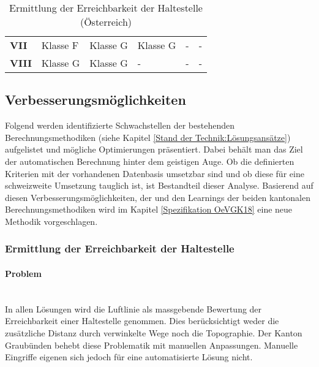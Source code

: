 \begin{table}[ht]
\begin{tabular}[c]{l p{2.0cm} p{2.0cm} p{2.0cm} p{2.0cm} p{2.0cm}}
        \cellcolor{red!25}\textbf{VII}
                                & \cellcolor{red!25}Klasse F
                                & \cellcolor{red!25}Klasse G
                                & \cellcolor{red!25}Klasse G
                                & -
                                & -\\
        \cellcolor{red!25}\textbf{VIII}
                                & \cellcolor{red!25}Klasse G
                                & \cellcolor{red!25}Klasse G
                                & -
                                & -
                                & -\\                          
        \bottomrule
    \end{tabular}
    \caption{Ermittlung der Erreichbarkeit der \gls{Haltestelle} (Österreich)}
    \label{table:Ermittlung Erreichbarkeit der Haltestelle (Österreich)}
\end{table}

\subsection{Verbesserungsmöglichkeiten}
\label{Stand der Technik:Verbesserungsmöglichkeiten und Zusammenhang zu bestehenden Lösungen}

Folgend werden identifizierte Schwachstellen der bestehenden Berechnungsmethodiken (siehe Kapitel \ref{Stand der Technik:Lösungsansätze}) aufgelistet und mögliche Optimierungen präsentiert.
Dabei behält man das Ziel der automatischen Berechnung hinter dem geistigen Auge.
Ob die definierten Kriterien mit der vorhandenen Datenbasis umsetzbar sind und ob diese für eine schweizweite Umsetzung tauglich ist, ist Bestandteil dieser Analyse.
Basierend auf diesen Verbesserungsmöglichkeiten, der  und den Learnings der beiden kantonalen Berechnungsmethodiken wird im Kapitel \ref{Spezifikation OeVGK18} eine neue Methodik vorgeschlagen.

\subsubsection{Ermittlung der Erreichbarkeit der Haltestelle}
\label{Verbesserungsmöglichkeiten:Ermittlung der Erreichbarkeit der Haltestelle}

\paragraph{Problem}~\\
In allen Lösungen wird die Luftlinie als massgebende Bewertung der Erreichbarkeit einer \gls{Haltestelle} genommen.
Dies berücksichtigt weder die zusätzliche Distanz durch verwinkelte Wege noch die Topographie.
Der Kanton Graubünden behebt diese Problematik mit manuellen Anpassungen.
Manuelle Eingriffe eigenen sich jedoch für eine automatisierte Lösung nicht.


